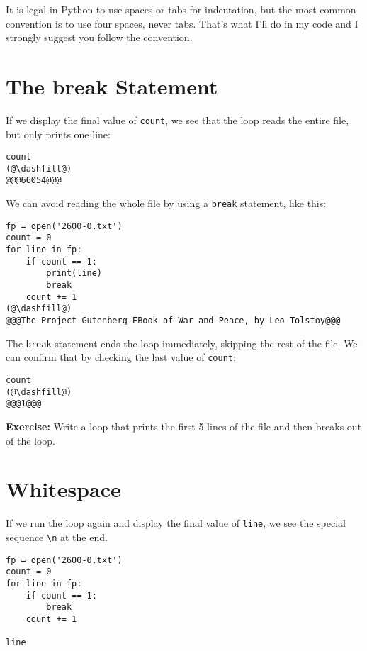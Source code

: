 It is legal in Python to use spaces or tabs for indentation, but the
most common convention is to use four spaces, never tabs. That's what
I'll do in my code and I strongly suggest you follow the convention.

\hypertarget{the-break-statement}{%
\section{The break Statement}\label{the-break-statement}}

If we display the final value of \passthrough{\lstinline!count!}, we see
that the loop reads the entire file, but only prints one line:

\begin{lstlisting}[]
count
(@\dashfill@)
@@@66054@@@
\end{lstlisting}

We can avoid reading the whole file by using a
\passthrough{\lstinline!break!} statement, like this:

\begin{lstlisting}[]
fp = open('2600-0.txt')
count = 0
for line in fp:
    if count == 1:
        print(line)
        break
    count += 1
(@\dashfill@)
@@@The Project Gutenberg EBook of War and Peace, by Leo Tolstoy@@@
\end{lstlisting}

The \passthrough{\lstinline!break!} statement ends the loop immediately,
skipping the rest of the file. We can confirm that by checking the last
value of \passthrough{\lstinline!count!}:

\begin{lstlisting}[]
count
(@\dashfill@)
@@@1@@@
\end{lstlisting}

\textbf{Exercise:} Write a loop that prints the first 5 lines of the
file and then breaks out of the loop.

\hypertarget{whitespace}{%
\section{Whitespace}\label{whitespace}}

If we run the loop again and display the final value of
\passthrough{\lstinline!line!}, we see the special sequence
\passthrough{\lstinline!\\n!} at the end.

\begin{lstlisting}[]
fp = open('2600-0.txt')
count = 0
for line in fp:
    if count == 1:
        break
    count += 1

line
\end{lstlisting}

